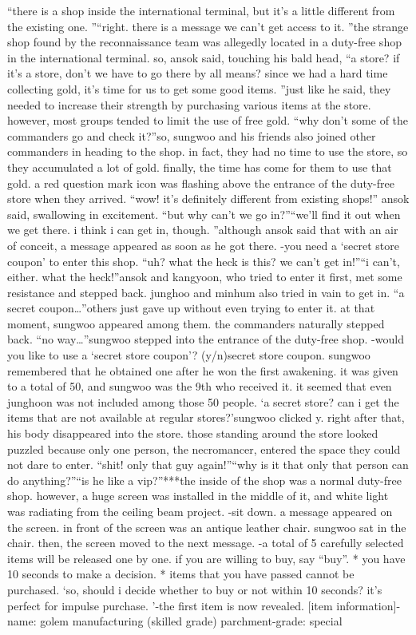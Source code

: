 “there is a shop inside the international terminal, but it’s a little different from the existing one.
”“right.
 there is a message we can’t get access to it.
”the strange shop found by the reconnaissance team was allegedly located in a duty-free shop in the international terminal.
so, ansok said, touching his bald head, “a store? if it’s a store, don’t we have to go there by all means? since we had a hard time collecting gold, it’s time for us to get some good items.
”just like he said, they needed to increase their strength by purchasing various items at the store.
 however, most groups tended to limit the use of free gold.
“why don’t some of the commanders go and check it?”so, sungwoo and his friends also joined other commanders in heading to the shop.
in fact, they had no time to use the store, so they accumulated a lot of gold.
 finally, the time has come for them to use that gold.
a red question mark icon was flashing above the entrance of the duty-free store when they arrived.
“wow! it’s definitely different from existing shops!” ansok said, swallowing in excitement.
“but why can’t we go in?”“we’ll find it out when we get there.
 i think i can get in, though.
”although ansok said that with an air of conceit, a message appeared as soon as he got there.
-you need a ‘secret store coupon’ to enter this shop.
“uh? what the heck is this? we can’t get in!”“i can’t, either.
 what the heck!”ansok and kangyoon, who tried to enter it first, met some resistance and stepped back.
junghoo and minhum also tried in vain to get in.
“a secret coupon…”others just gave up without even trying to enter it.
at that moment, sungwoo appeared among them.
 the commanders naturally stepped back.
“no way…”sungwoo stepped into the entrance of the duty-free shop.
-would you like to use a ‘secret store coupon’? (y/n)secret store coupon.
 sungwoo remembered that he obtained one after he won the first awakening.
 it was given to a total of 50, and sungwoo was the 9th who received it.
it seemed that even junghoon was not included among those 50 people.
‘a secret store? can i get the items that are not available at regular stores?’sungwoo clicked y.
 right after that, his body disappeared into the store.
 those standing around the store looked puzzled because only one person, the necromancer, entered the space they could not dare to enter.
“shit! only that guy again!”“why is it that only that person can do anything?”“is he like a vip?”***the inside of the shop was a normal duty-free shop.
 however, a huge screen was installed in the middle of it, and white light was radiating from the ceiling beam project.
-sit down.
a message appeared on the screen.
 in front of the screen was an antique leather chair.
sungwoo sat in the chair.
 then, the screen moved to the next message.
-a total of 5 carefully selected items will be released one by one.
 if you are willing to buy, say “buy”.
* you have 10 seconds to make a decision.
* items that you have passed cannot be purchased.
‘so, should i decide whether to buy or not within 10 seconds? it’s perfect for impulse purchase.
’-the first item is now revealed.
[item information]-name: golem manufacturing (skilled grade) parchment-grade: special

